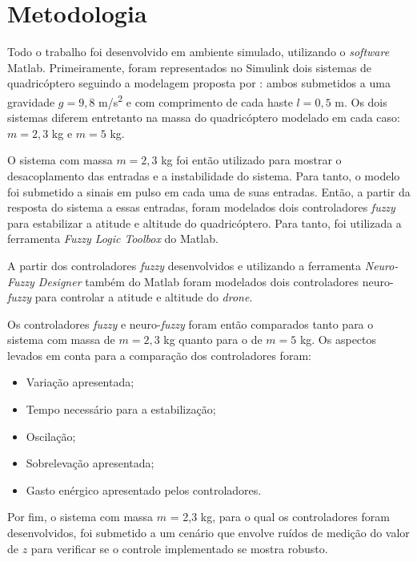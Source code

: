 \chapter{Metodologia}
\label{chap:metodologia}

Todo o trabalho foi desenvolvido em ambiente simulado, utilizando o \textit{software} Matlab\textsuperscript{\textregistered}. Primeiramente, foram representados no Simulink\textsuperscript{\textregistered} dois sistemas de quadricóptero seguindo a modelagem proposta por : ambos submetidos a uma gravidade $g = 9,8$ m/s\textsuperscript{2} e com comprimento de cada haste $l = 0,5$ m. Os dois sistemas diferem entretanto na massa do quadricóptero modelado em cada caso: $m = 2,3$ kg e $m = 5$ kg.

O sistema com massa $m = 2,3$ kg foi então utilizado para mostrar o desacoplamento das entradas e a instabilidade do sistema. Para tanto, o modelo foi submetido a sinais em pulso em cada uma de suas entradas. Então, a partir da resposta do sistema a essas entradas, foram modelados dois controladores \textit{fuzzy} para estabilizar a atitude e altitude do quadricóptero. Para tanto, foi utilizada a ferramenta \textit{Fuzzy Logic Toolbox} do Matlab\textsuperscript{\textregistered}.

A partir dos controladores \textit{fuzzy} desenvolvidos e utilizando a ferramenta \textit{Neuro-Fuzzy Designer} também do Matlab\textsuperscript{\textregistered} foram modelados dois controladores neuro-\textit{fuzzy} para controlar a atitude e altitude do \textit{drone}.

Os controladores \textit{fuzzy} e neuro-\textit{fuzzy} foram então comparados tanto para o sistema com massa de $m = 2,3$ kg quanto para o de $m = 5$ kg. Os aspectos levados em conta para a comparação dos controladores foram:
\begin{itemize}
	\item Variação apresentada;
	\item Tempo necessário para a estabilização;
	\item Oscilação;
	\item Sobrelevação apresentada;
	\item Gasto enérgico apresentado pelos controladores.
\end{itemize}

Por fim, o sistema com massa $m$ = 2,3 kg, para o qual os controladores foram desenvolvidos, foi submetido a um cenário que envolve ruídos de medição do valor de $z$ para verificar se o controle implementado se mostra robusto.
